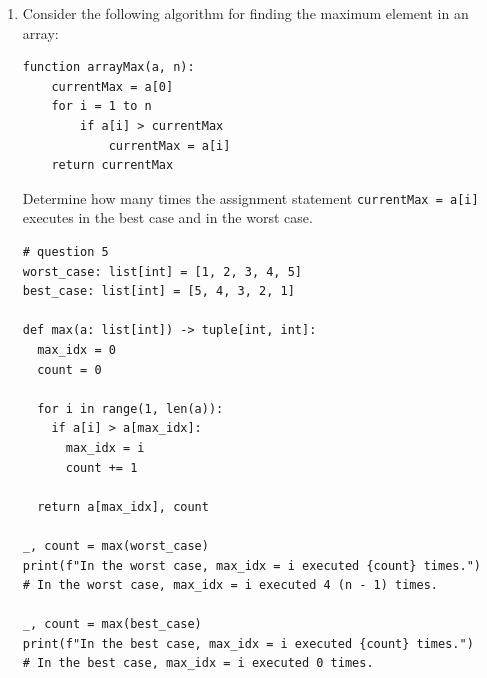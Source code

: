 \documentclass[12pt]{scrartcl}
\begin{document}
\begin{enumerate}[label=\textbf{\arabic*.}]
	      \vspace{0.3cm}
	      \begin{lstlisting}
arr: list[int] = [1, 3, 5, 7, 9, 11, 13, 15]

def insert(a: list[int], x: int) -> list[int]:
  n: int = len(a)
  
  # iterate list and check if element to insert is 
  # lt current element then insert at position
  for i in range(0, n):
    if x < a[i]:
      a.insert(i, x)
      return a
      
  # element to insert is larger than all current elements  
  a.append(x)
  return a

insert(arr, 17)

print(arr)  # [1, 3, 5, 7, 9, 11, 13, 15, 17]
\end{lstlisting}

	      \newpage
	\item
	      Consider the following algorithm for finding the maximum element in an array:

	      \begin{lstlisting}
function arrayMax(a, n):
    currentMax = a[0]
    for i = 1 to n
        if a[i] > currentMax
            currentMax = a[i]
    return currentMax
\end{lstlisting}

	      Determine how many times the assignment statement
	      \texttt{currentMax = a[i]} executes in the best case and in the worst case.

	      \vspace{0.3cm}
	      \begin{lstlisting}
# question 5
worst_case: list[int] = [1, 2, 3, 4, 5]
best_case: list[int] = [5, 4, 3, 2, 1]

def max(a: list[int]) -> tuple[int, int]:
  max_idx = 0
  count = 0

  for i in range(1, len(a)):
    if a[i] > a[max_idx]:
      max_idx = i
      count += 1

  return a[max_idx], count

_, count = max(worst_case)
print(f"In the worst case, max_idx = i executed {count} times.")
# In the worst case, max_idx = i executed 4 (n - 1) times.

_, count = max(best_case)
print(f"In the best case, max_idx = i executed {count} times.")
# In the best case, max_idx = i executed 0 times.
\end{lstlisting}
\end{enumerate}
\end{document}
